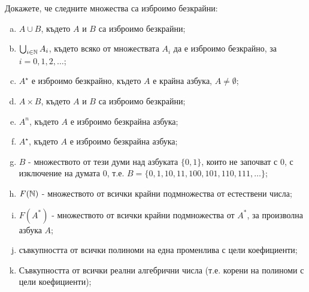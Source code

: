 \begin{problem}
  Докажете, че следните множества са изброимо безкрайни:
  \begin{enumerate}[a)]
  \item 
    $A \cup B$, където $A$ и $B$ са изброимо безкрайни;
  \item
    $\bigcup_{i\in\mathbb{N}} A_i$, където всяко от множествата $A_i$ да е изброимо безкрайно, за $i = 0,1,2,\dots$;
  \item
    $A^\star$ е изброимо безкрайно, където $A$ е крайна азбука, $A \neq \emptyset$;
  \item
    $A \times B$, където $A$ и $B$ са изброимо безкрайни;
  \item
    $A^n$, където $A$ е изброимо безкрайна азбука;
  \item
    $A^\star$, където $A$ е изброимо безкрайна азбука;
  \item
    $B$ - множеството от тези думи над азбуката $\{0,1\}$, които не започват с $0$, с изключение на 
    думата $0$, т.е. $B = \{0, 1, 10, 11, 100, 101, 110, 111, \dots\}$;
  \item
    $F(\mathbb{N})$ - множеството от всички крайни подмножества от естествени числа;
  \item
    $F(A^*)$ - множеството от всички крайни подмножества от $A^*$, за произволна азбука $A$;
  \item
    съвкупността от всички полиноми на една променлива с цели коефициенти;
  \item
    Съвкупността от всички реални алгебрични числа (т.е. корени на полиноми с цели коефициенти);
  \end{enumerate}
\end{problem}
